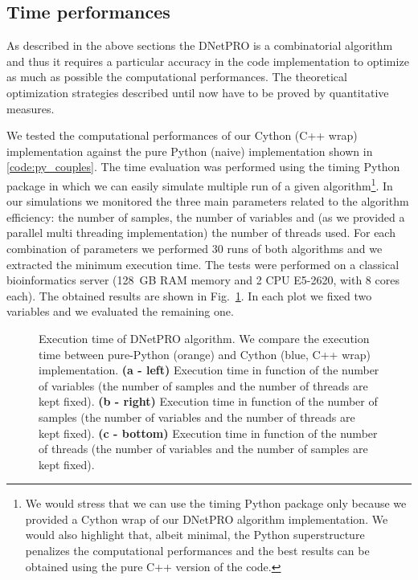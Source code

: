 \documentclass{standalone}
\begin{document}
\subsection[Time performances]{Time performances}\label{implementation:timing}

As described in the above sections the DNetPRO is a combinatorial algorithm and thus it requires a particular accuracy in the code implementation to optimize as much as possible the computational performances.
The theoretical optimization strategies described until now have to be proved by quantitative measures.

We tested the computational performances of our \textsf{Cython} (\textsf{C++} wrap) implementation against the pure \textsf{Python} (naive) implementation shown in \ref{code:py_couples}.
The time evaluation was performed using the \textsf{timing} \textsf{Python} package in which we can easily simulate multiple run of a given algorithm\footnote{
  We would stress that we can use the \textsf{timing} \textsf{Python} package only because we provided a Cython wrap of our DNetPRO algorithm implementation.
  We would also highlight that, albeit minimal, the \textsf{Python} superstructure penalizes the computational performances and the best results can be obtained using the pure \textsf{C++} version of the code.
}.
In our simulations we monitored the three main parameters related to the algorithm efficiency: the number of samples, the number of variables and (as we provided a parallel multi threading implementation) the number of threads used.
For each combination of parameters we performed 30 runs of both algorithms and we extracted the minimum execution time.
The tests were performed on a classical bioinformatics server (128~GB RAM memory and 2 CPU E5-2620, with 8 cores each).
The obtained results are shown in Fig.~\ref{fig:dnetpro_timing}.
In each plot we fixed two variables and we evaluated the remaining one.

\begin{figure}[htbp]
\hspace{-1.0cm}
\def\svgwidth{0.45\textwidth}

\qquad
\hspace{1.0cm}
\def\svgwidth{0.45\textwidth}

\qquad\qquad
\centering
\def\svgwidth{0.7\textwidth}

\caption{Execution time of DNetPRO algorithm.
We compare the execution time between pure-\textsf{Python} (orange) and Cython (blue, \textsf{C++} wrap) implementation.
\textbf{(a - left)} Execution time in function of the number of variables (the number of samples and the number of threads are kept fixed).
\textbf{(b - right)} Execution time in function of the number of samples (the number of variables and the number of threads are kept fixed).
\textbf{(c - bottom)} Execution time in function of the number of threads (the number of variables and the number of samples are kept fixed).
}
\label{fig:dnetpro_timing}
\end{figure}
\end{document}
